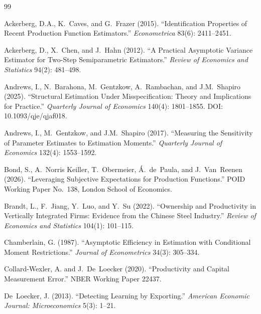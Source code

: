 \documentclass[11pt]{article}
\begin{document}
\begin{thebibliography}{99}

Ackerberg, D.A., K.~Caves, and G.~Frazer (2015).
``Identification Properties of Recent Production Function Estimators.''
\emph{Econometrica} 83(6): 2411--2451.

Ackerberg, D., X.~Chen, and J.~Hahn (2012).
``A Practical Asymptotic Variance Estimator for Two-Step Semiparametric Estimators.''
\emph{Review of Economics and Statistics} 94(2): 481--498.

Andrews, I., N.~Barahona, M.~Gentzkow, A.~Rambachan, and J.M.~Shapiro (2025).
``Structural Estimation Under Misspecification: Theory and Implications for Practice.''
\emph{Quarterly Journal of Economics} 140(4): 1801--1855. DOI: 10.1093/qje/qjaf018.

Andrews, I., M.~Gentzkow, and J.M.~Shapiro (2017).
``Measuring the Sensitivity of Parameter Estimates to Estimation Moments.''
\emph{Quarterly Journal of Economics} 132(4): 1553--1592.

Bond, S., A.~Norris Keiller, T.~Obermeier, \'A.~de~Paula, and J.~Van~Reenen (2026).
``Leveraging Subjective Expectations for Production Functions.''
POID Working Paper No.~138, London School of Economics.

Brandt, L., F.~Jiang, Y.~Luo, and Y.~Su (2022).
``Ownership and Productivity in Vertically Integrated Firms: Evidence from the Chinese Steel Industry.''
\emph{Review of Economics and Statistics} 104(1): 101--115.

Chamberlain, G. (1987).
``Asymptotic Efficiency in Estimation with Conditional Moment Restrictions.''
\emph{Journal of Econometrics} 34(3): 305--334.

Collard-Wexler, A. and J.~De~Loecker (2020).
``Productivity and Capital Measurement Error.''
NBER Working Paper 22437.

De~Loecker, J. (2013).
``Detecting Learning by Exporting.''
\emph{American Economic Journal: Microeconomics} 5(3): 1--21.


\end{thebibliography}
\end{document}
